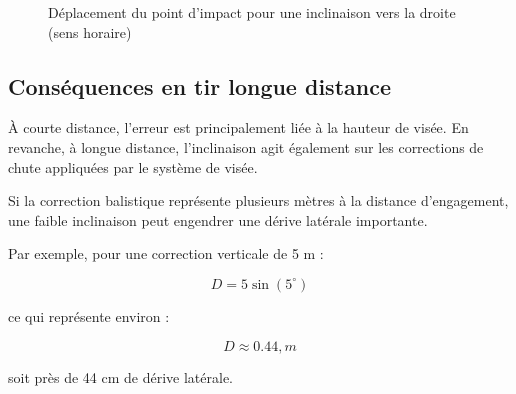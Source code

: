 \begin{figure}[H]
\centering
{}
\caption{Déplacement du point d'impact pour une inclinaison vers la droite (sens horaire)}
\end{figure}

\subsection{Conséquences en tir longue distance}

À courte distance, l'erreur est principalement liée à la hauteur de visée. En revanche, à longue distance, l'inclinaison agit également sur les corrections de chute appliquées par le système de visée.

Si la correction balistique représente plusieurs mètres à la distance d'engagement, une faible inclinaison peut engendrer une dérive latérale importante.

Par exemple, pour une correction verticale de 5 m :

\begin{equation}
D = 5 \sin(5^\circ)
\end{equation}

ce qui représente environ :

\begin{equation}
D \approx 0.44,m
\end{equation}

soit près de 44 cm de dérive latérale.

